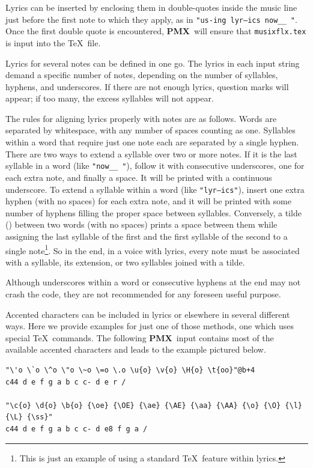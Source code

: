 \documentclass[11pt]{article}
\newcommand\PMXX{\textbf{PMX}}
\newcommand\PMX{\PMXX~}
\begin{document}
Lyrics can be inserted by enclosing them in double-quotes inside the music line 
just before the first note to which they apply, as in
{\tt "us-ing lyr---ics now\_\_ "}. Once the first double quote is encountered, \PMX will
ensure that {\tt musixflx.tex} is input into the \TeX~file. 

Lyrics for several notes can be defined in one go. 
The lyrics in each input string demand a specific number of notes, depending on
the number of syllables, hyphens, and underscores. If there are not enough lyrics, 
question marks will appear; if too many, the excess syllables will not appear.

The rules for aligning lyrics properly with notes are as follows. Words are 
separated by whitespace, with any number of spaces counting as one. Syllables
within a word that require just one note each are separated by a single hyphen. There are 
two ways to extend a syllable over two or more notes. If it is the last syllable in 
a word (like {\tt "now\_\_ "}), follow it with consecutive underscores, one for each extra 
note, and finally a space. It will be printed with a continuous underscore. 
To extend a syllable within a word (like {\tt "lyr---ics"}), insert one extra hyphen
(with no spaces) for each 
extra note, and it will be printed with some number of hyphens filling the proper 
space between syllables. Conversely, a tilde ({\tt {}}) between two words 
(with no spaces) prints a space between them while assigning the last syllable of the 
first and the first syllable of the second to a single note\footnote{This is just an 
example of using a standard \TeX\ feature within lyrics.}. So in the end, in a voice 
with lyrics, every note must be associated with a syllable, its extension, or two 
syllables joined with a tilde.

Although underscores within a word or consecutive hyphens at the end may not crash the 
code, they are not recommended for any foreseen useful purpose.

Accented characters can be included in lyrics or elsewhere in several different ways. Here
we provide examples for just one of those methods, one which uses special \TeX~commands.
The following \PMX input contains most of the available accented characters and 
leads to the example pictured below.

\begin{verbatim}
"\'o \`o \^o \"o \~o \=o \.o \u{o} \v{o} \H{o} \t{oo}"@b+4 
c44 d e f g a b c c- d e r / 

"\c{o} \d{o} \b{o} {\oe} {\OE} {\ae} {\AE} {\aa} {\AA} {\o} {\O} {\l} {\L} {\ss}" 
c44 d e f g a b c c- d e8 f g a /
\end{verbatim}
\end{document}
